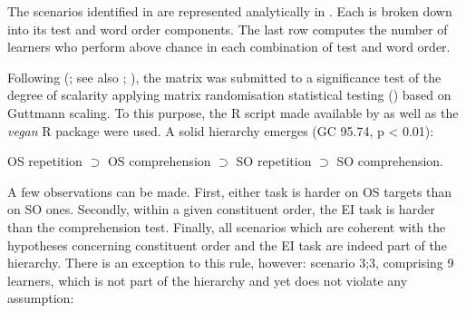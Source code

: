 The scenarios identified in  are represented analytically in . Each is broken down into its test and word order components. The last row computes the number of learners who perform above chance in each combination of test and word order. 

\begin{table}
    \caption{Implicational hierarchy at T1}
    \label{tab:06:4}
\end{table}

Following \citeauthor{AldaiWichmann2018} (\citeyear{AldaiWichmann2018}; see also \citealt{Nyqvist2018, Wichmann2015, Wichmann2016}; \citealt[210-212]{HatchLazaraton1991}), the matrix was submitted to a significance test of the degree of scalarity applying matrix randomisation statistical testing (\citealt{JanssenEtAl2006}) based on Guttmann scaling. To this purpose, the R script made available by \citet{AldaiWichmann2018} as well as the \textit{vegan} R package \citep{OksanenEtAl2019} were used. A solid hierarchy emerges (GC 95.74, p < 0.01): 

OS repetition ${\supset}$ OS comprehension ${\supset}$ SO repetition ${\supset}$ SO comprehension. 

A few observations can be made. First, either task is harder on OS targets than on SO ones. Secondly, within a given constituent order, the EI task is harder than the comprehension test. Finally, all scenarios which are coherent with the hypotheses concerning constituent order and the EI task are indeed part of the hierarchy. There is an exception to this rule, however: scenario 3;3, comprising 9 learners, which is not part of the hierarchy and yet does not violate any assumption:

